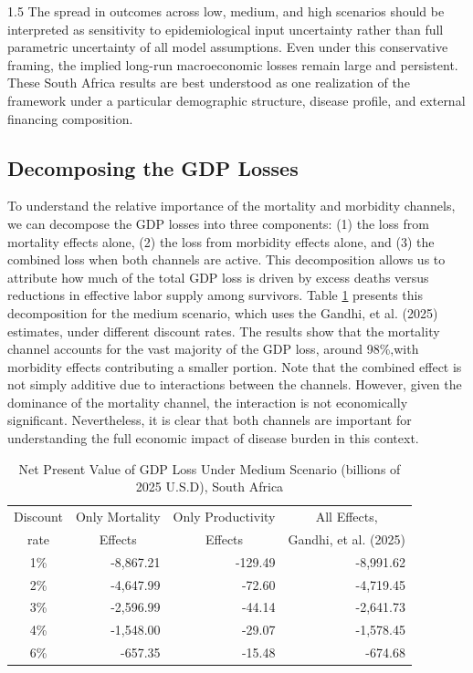 \documentclass[letterpaper,12pt]{article}
\theoremstyle{definition}
\begin{document}
\begin{spacing}{1.5}
The spread in outcomes across low, medium, and high scenarios should be interpreted as sensitivity to epidemiological input uncertainty rather than full parametric uncertainty of all model assumptions. Even under this conservative framing, the implied long-run macroeconomic losses remain large and persistent. These South Africa results are best understood as one realization of the framework under a particular demographic structure, disease profile, and external financing composition.


\subsection{Decomposing the GDP Losses}

To understand the relative importance of the mortality and morbidity channels, we can decompose the GDP losses into three components: (1) the loss from mortality effects alone, (2) the loss from morbidity effects alone, and (3) the combined loss when both channels are active. This decomposition allows us to attribute how much of the total GDP loss is driven by excess deaths versus reductions in effective labor supply among survivors. Table \ref{tab:NPVdecomposition} presents this decomposition for the medium scenario, which uses the Gandhi, et al. (2025) estimates, under different discount rates. The results show that the mortality channel accounts for the vast majority of the GDP loss, around 98\%,with morbidity effects contributing a smaller portion. Note that the combined effect is not simply additive due to interactions between the channels. However, given the dominance of the mortality channel, the interaction is not economically significant. Nevertheless, it is clear that both channels are important for understanding the full economic impact of disease burden in this context.

\begin{table}[H] \centering \captionsetup{width=6.0in}
\caption{\label{tab:NPVdecomposition}Net Present Value of GDP Loss Under Medium Scenario (billions of 2025 U.S.D), South Africa}
\begin{tabular}{crrr}
\hline
\multicolumn{1}{c}{Discount} & \multicolumn{1}{c}{Only Mortality} & \multicolumn{1}{c}{Only Productivity} & \multicolumn{1}{c}{All Effects,}\\
 \multicolumn{1}{c}{rate} & \multicolumn{1}{c}{Effects} & \multicolumn{1}{c}{Effects} & \multicolumn{1}{c}{Gandhi, et al. (2025)} \\
\hline \hline
1\% & -8,867.21 & -129.49 & -8,991.62 \\
2\% & -4,647.99 & -72.60 & -4,719.45 \\
3\% & -2,596.99 & -44.14 & -2,641.73 \\
4\% & -1,548.00 & -29.07 & -1,578.45 \\
6\% & -657.35 & -15.48 & -674.68 \\
\hline\hline
\end{tabular}
\end{table}


\end{spacing}
\end{document}
